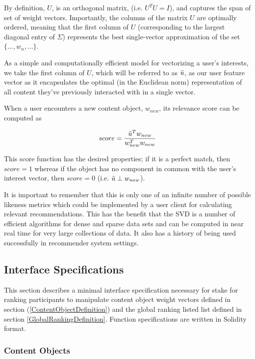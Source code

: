 By definition, $U$, is an orthogonal matrix, (i.e. $U^TU = I$), and captures the span of set of weight vectors. Importantly, the columns of the matrix $U$ are optimally ordered, meaning that the first column of $U$ (corresponding to the largest diagonal entry of $\Sigma$) represents the best single-vector approximation of the set $\{..., w_n,...\}$. 

As a simple and computationally efficient model for vectorizing a user's interests, we take the first column of $U$, which will be referred to as $\Tilde{u}$, as our user feature vector as it encapsulates the optimal (in the Euclidean norm) representation of all content they've previously interacted with in a single vector.

When a user encounters a new content object, $w_{new}$, its relevance score can be computed as

\begin{equation}
    score = \frac{\Tilde{u}^Tw_{new}}{w_{new}^Tw_{new}}
\end{equation}

This score function has the desired properties; if it is a perfect match, then $score=1$ whereas if the object has no component in common with the user's interest vector, then $score = 0$ (i.e. $\Tilde{u} \perp w_{new}$).

It is important to remember that this is only one of an infinite number of possible likeness metrics which could be implemented by a user client for calculating relevant recommendations. This has the benefit that the SVD is a number of efficient algorithms for dense and sparse data sets and can be computed in near real time for very large collections of data. It also has a history of being used successfully in recommender system settings. 

\subsection{Interface Specifications}
\label{InterfaceDefinition}
This section describes a minimal interface specification necessary for stake for ranking participants to manipulate content object weight vectors defined in section (\ref{ContentObjectDefinition}) and the global ranking listed list defined in section \ref{GlobalRankingDefinition}. Function specifications are written in Solidity format.


\subsubsection{Content Objects}

